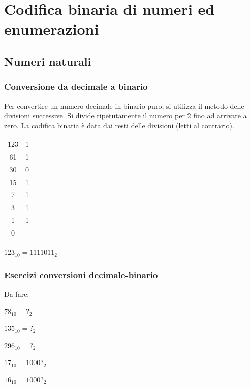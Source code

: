 \documentclass[handout]{beamer}
\begin{document}
\section{Codifica binaria di numeri ed enumerazioni}

\subsection{Numeri naturali}

\begin{frame}
\frametitle{Conversione da decimale a binario}
Per convertire un numero decimale in binario puro, si utilizza il metodo delle \alert{divisioni successive}. Si divide ripetutamente il numero per 2 fino ad arrivare a zero. La codifica binaria è data dai resti delle divisioni (letti al contrario).

\begin{table}[h]
	\begin{tabular}{c|c}
		123 & 1 \\
		61  & 1 \\
		30  & 0 \\
		15  & 1 \\
		7   & 1 \\
		3   & 1 \\
		1	& 1	\\
		0   &  \\
	\end{tabular}
\end{table}
$123_{10} = 1111011_2$
\end{frame}

\begin{frame}
\frametitle{Esercizi conversioni decimale-binario}
Da fare:

$78_{10} = ?_{2}$

$135_{10} = ?_{2}$

$296_{10} = ?_{2}$

$17_{10} = 1000?_{2}$

$16_{10} = 1000?_{2}$

\end{frame}
\end{document}
